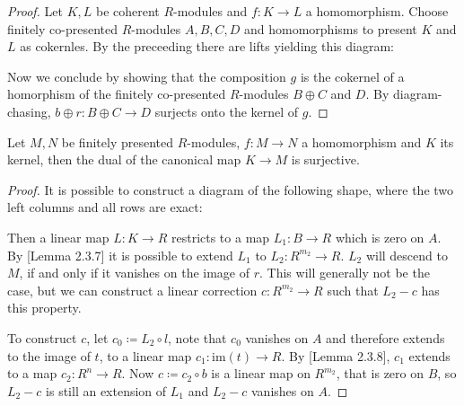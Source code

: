 \begin{proof}
  Let $K,L$ be coherent $R$-modules and $f:K\to L$ a homomorphism.
  Choose finitely co-presented $R$-modules $A,B,C,D$ and homomorphisms to present $K$ and $L$ as cokernles.
  By the preceeding  there are lifts yielding this diagram:
  \begin{center}
  \end{center}
  Now we conclude by showing that the composition $g$ is the cokernel of a homorphism of the finitely co-presented $R$-modules $B\oplus C$ and $D$.
  By diagram-chasing, $b\oplus r:B\oplus C\to D$ surjects onto the kernel of $g$.
\end{proof}

\begin{lemma}
  \label{fp-kernel-dual-surjective}
  Let $M,N$ be finitely presented $R$-modules, $f:M\to N$ a homomorphism and $K$ its kernel,
  then the dual of the canonical map $K\to M$ is surjective.
\end{lemma}

\begin{proof}
  It is possible to construct a diagram of the following shape, where the two left columns and all rows are exact:
  \begin{center}
  \end{center}
  Then a linear map $L:K\to R$ restricts to a map $L_1:B\to R$ which is zero on $A$.
  By \cite{diffgeo-article}[Lemma 2.3.7] it is possible to extend $L_1$ to $L_2:R^{m_2}\to R$.
  $L_2$ will descend to $M$, if and only if it vanishes on the image of $r$.
  This will generally not be the case, but we can construct a linear correction $c:R^{m_2}\to R$ such that $L_2-c$ has this property.

  To construct $c$, let $c_0\coloneq L_2\circ l$, note that $c_0$ vanishes on $A$ and therefore extends to the image of $t$, to a linear map $c_1:\mathrm{im}(t)\to R$.
  By \cite{diffgeo-article}[Lemma 2.3.8], $c_1$ extends to a map $c_2:R^{n}\to R$.
  Now $c\coloneq c_2\circ b$ is a linear map on $R^{m_2}$, that is zero on $B$,
  so $L_2-c$ is still an extension of $L_1$ and $L_2-c$ vanishes on $A$.
\end{proof}


